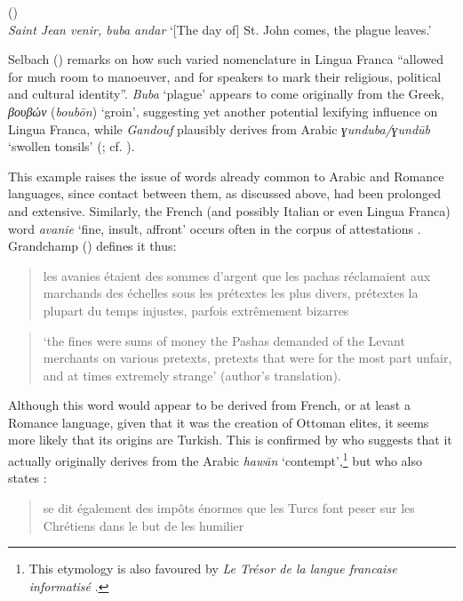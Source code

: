 \documentclass[output=paper]{langsci/langscibook}
\begin{document}
	\ea
	(\citealt{Rehbinder1800})\\
	\textit{Saint Jean venir, buba andar} 
	\glt ‘[The day of] St. John comes, the plague leaves.’ 
	\z
	
	Selbach (\citeyear[44]{Selbach2008}) remarks on how such varied nomenclature in Lingua Franca ``allowed for much room to manoeuver, and for speakers to mark their religious, political and cultural identity''. \textit{Buba} ‘plague’ appears to come originally from the Greek, \textit{βουβών} (\textit{boubōn}) ‘groin’, suggesting yet another potential lexifying influence on Lingua Franca, while \textit{Gandouf} plausibly derives from Arabic \textit{ɣunduba/ɣundūb} ‘swollen tonsils’ (\citealt[72]{Schuchardt1909}; cf. \citealt[45]{Selbach2008}). 
	
	This example raises the issue of words already common to Arabic and Romance languages, since contact between them, as discussed above, had been prolonged and extensive. Similarly, the French (and possibly Italian or even Lingua Franca) word \textit{avanie} ‘fine, insult, affront’ occurs often in the corpus of attestations \citep{Pananti1841,Grandchamp1920}. Grandchamp (\citeyear[xiii]{Grandchamp1920}) defines it thus: 
	
	\begin{quote}
		les avanies étaient des sommes d'argent que les pachas réclamaient aux marchands des échelles sous les prétextes les plus divers, prétextes la plupart du temps injustes, parfois extrêmement bizarres
	\end{quote}
	
	\begin{quote}
		‘the fines were sums of money the Pashas demanded of the Levant merchants on various pretexts, pretexts that were for the most part unfair, and at times extremely strange’ (author's translation).
	\end{quote}
	
	Although this word would appear to be derived from French, or at least a Romance language, given that it was the creation of Ottoman elites, it seems more likely that its origins are Turkish. This is confirmed by \citet{Pihan1847} who suggests that it actually originally derives from the Arabic \textit{hawān} ‘contempt’,\footnote{This etymology is also favoured by \textit{Le Trésor de la langue francaise informatisé} \citep{Dendien1994}.} but who also states \citep[46]{Pihan1847}:
	
	\begin{quote}
		se dit également des impôts énormes que les Turcs font peser sur les Chrétiens dans le but de les humilier
	\end{quote}
	
\end{document}
